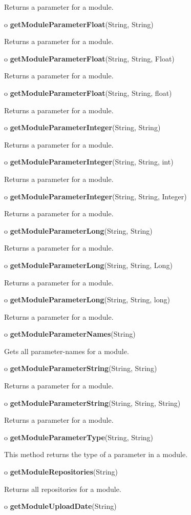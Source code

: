 \begin{description}
Returns a parameter for a module.  
\item o {\bf getModuleParameterFloat}(String, String)  

Returns a parameter for a module.  
\item o {\bf getModuleParameterFloat}(String, String, Float)  

Returns a parameter for a module.  
\item o {\bf getModuleParameterFloat}(String, String, float)  

Returns a parameter for a module.  
\item o {\bf getModuleParameterInteger}(String, String)  

Returns a parameter for a module.  
\item o {\bf getModuleParameterInteger}(String, String, int)  

Returns a parameter for a module.  
\item o {\bf getModuleParameterInteger}(String, String, Integer)  

Returns a parameter for a module.  
\item o {\bf getModuleParameterLong}(String, String)  

Returns a parameter for a module.  
\item o {\bf getModuleParameterLong}(String, String, Long)  

Returns a parameter for a module.  
\item o {\bf getModuleParameterLong}(String, String, long)  

Returns a parameter for a module.  
\item o {\bf getModuleParameterNames}(String)  

Gets all parameter-names for a module.  
\item o {\bf getModuleParameterString}(String, String)  

Returns a parameter for a module.  
\item o {\bf getModuleParameterString}(String, String, String)  

Returns a parameter for a module.  
\item o {\bf getModuleParameterType}(String, String)  

This method returns the type of a parameter in a module.  
\item o {\bf getModuleRepositories}(String)  

Returns all repositories for a module.  
\item o {\bf getModuleUploadDate}(String)  


\end{description}
